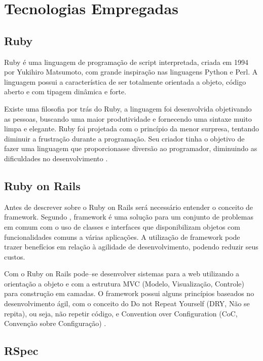 \section{Tecnologias Empregadas}

\subsection{Ruby}

Ruby \'e uma linguagem de programa\c{c}\~ao de script interpretada, criada em 1994 por Yukihiro Matsumoto, com grande inspira\c{c}\~ao nas linguagens Python e Perl. A linguagem possui a caracter\'istica de ser totalmente orientada a objeto, c\'odigo aberto e com tipagem din\^amica e forte.

Existe uma filosofia por tr\'as do Ruby, a linguagem foi desenvolvida objetivando as pessoas, buscando uma maior produtividade e fornecendo uma sintaxe muito limpa e elegante. Ruby foi projetada com o princ\'ipio da menor surpresa, tentando diminuir a frustra\c{c}\~ao durante a programa\c{c}\~ao. Seu criador tinha o objetivo de fazer uma linguagem que proporcionasse divers\~ao ao programador, diminuindo as dificuldades no desenvolvimento \cite{flanagan2008ruby}.

\subsection{Ruby on Rails}

Antes de descrever sobre o Ruby on Rails ser\'a necess\'ario entender o conceito de framework. Segundo \cite{hartl2012ruby}, framework \'e uma solu\c{c}\~ao para um conjunto de problemas em comum com o uso de classes e interfaces que disponibilizam objetos com funcionalidades comuns a v\'arias aplica\c{c}\~oes. A utiliza\c{c}\~ao de framework pode trazer benef\'icios em rela\c{c}\~ao \`a agilidade de desenvolvimento, podendo reduzir seus custos.

Com o Ruby on Rails pode--se desenvolver sistemas para a web utilizando a orienta\c{c}\~ao a objeto e com a estrutura MVC (Modelo, Visualiza\c{c}\~ao, Controle) para constru\c{c}\~ao em camadas. O framework possui alguns princ\'ipios baseados no desenvolvimento \'agil, com o conceito do Do not Repeat Yourself (DRY, N\~ao se repita), ou seja, n\~ao repetir c\'odigo, e Convention over Configuration (CoC, Conven\c{c}\~ao sobre Configura\c{c}\~ao) \cite{akita2006repensando}.

\subsection{RSpec}

